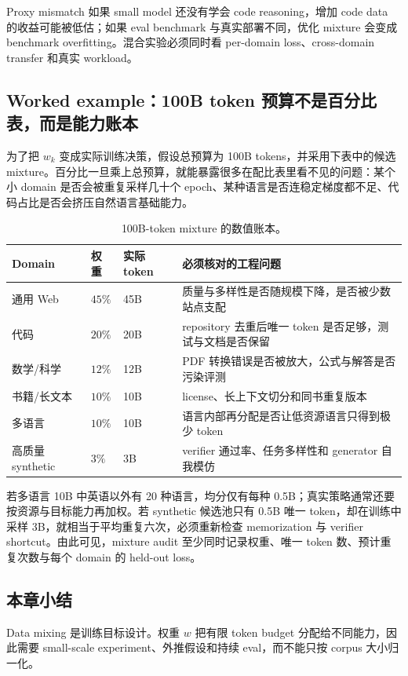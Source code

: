 \begin{warningbox}{Proxy mismatch}
如果 small model 还没有学会 code reasoning，增加 code data 的收益可能被低估；如果 eval benchmark 与真实部署不同，优化 mixture 会变成 benchmark overfitting。混合实验必须同时看 per-domain loss、cross-domain transfer 和真实 workload。
\end{warningbox}

\subsection{Worked example：100B token 预算不是百分比表，而是能力账本}

为了把 $w_k$ 变成实际训练决策，假设总预算为 100B tokens，并采用下表中的候选 mixture。百分比一旦乘上总预算，就能暴露很多在配比表里看不见的问题：某个小 domain 是否会被重复采样几十个 epoch、某种语言是否连稳定梯度都不足、代码占比是否会挤压自然语言基础能力。

\begin{table}[H]
\centering
\begin{tabular}{L{0.19\textwidth}L{0.13\textwidth}L{0.17\textwidth}L{0.35\textwidth}}
\toprule
Domain & 权重 & 实际 token & 必须核对的工程问题 \\
\midrule
通用 Web & $45\%$ & 45B & 质量与多样性是否随规模下降，是否被少数站点支配 \\
代码 & $20\%$ & 20B & repository 去重后唯一 token 是否足够，测试与文档是否保留 \\
数学/科学 & $12\%$ & 12B & PDF 转换错误是否被放大，公式与解答是否污染评测 \\
书籍/长文本 & $10\%$ & 10B & license、长上下文切分和同书重复版本 \\
多语言 & $10\%$ & 10B & 语言内部再分配是否让低资源语言只得到极少 token \\
高质量 synthetic & $3\%$ & 3B & verifier 通过率、任务多样性和 generator 自我模仿 \\
\bottomrule
\end{tabular}
\caption{100B-token mixture 的数值账本。}
\end{table}

若多语言 10B 中英语以外有 20 种语言，均分仅有每种 0.5B；真实策略通常还要按资源与目标能力再加权。若 synthetic 候选池只有 0.5B 唯一 token，却在训练中采样 3B，就相当于平均重复六次，必须重新检查 memorization 与 verifier shortcut。由此可见，mixture audit 至少同时记录权重、唯一 token 数、预计重复次数与每个 domain 的 held-out loss。

\subsection{本章小结}

Data mixing 是训练目标设计。权重 $w$ 把有限 token budget 分配给不同能力，因此需要 small-scale experiment、外推假设和持续 eval，而不能只按 corpus 大小归一化。

